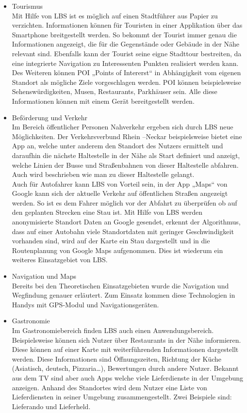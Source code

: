 \begin{itemize}
	\item Tourismus\\
	Mit Hilfe von LBS ist es möglich auf einen Stadtführer aus Papier zu verzichten. Informationen können für Touristen in einer Applikation über das Smartphone breitgestellt werden. So bekommt der Tourist immer genau die Informationen angezeigt, die für die Gegenstände oder Gebäude in der Nähe relevant sind. Ebenfalls kann der Tourist seine eigne Stadttour bestreiten, da eine integrierte Navigation zu Interessenten Punkten realisiert werden kann. Des Weiteren können POI „Points of Intererst“ in Abhängigkeit vom eigenen Standort als mögliche Ziele vorgeschlagen werden. POI können beispielsweise Sehenswürdigkeiten, Musen, Restaurants, Parkhäuser sein.
Alle diese Informationen können mit einem Gerät bereitgestellt werden.

	\item Beförderung und Verkehr\\
	Im Bereich öffentlicher Personen Nahverkehr ergeben sich durch LBS neue Möglichkeiten. Der Verkehrsverbund Rhein –Neckar beispielsweise bietet eine App an, welche unter anderem den Standort des Nutzers ermittelt und daraufhin die nächste Haltestelle in der Nähe als Start definiert und anzeigt, welche Linien der Busse und Straßenbahnen von dieser Haltestelle abfahren. Auch wird beschrieben wie man zu dieser Haltestelle gelangt.
\\Auch für Autofahrer kann LBS von Vorteil sein, in der App „Maps“ von Google kann sich der aktuelle Verkehr auf öffentlichen Straßen angezeigt werden. So ist es dem Fahrer möglich vor der Abfahrt zu überprüfen ob auf den geplanten Strecken eine Stau ist. Mit Hilfe von LBS werden anonymisierte Standort Daten an Google gesendet, erkennt der Algorithmus, dass auf einer Autobahn viele Standortdaten mit geringer Geschwindigkeit vorhanden sind, wird auf der Karte ein Stau dargestellt und in die Routenplanung von Google Maps aufgenommen. Dies ist wiederum ein weiteres Einsatzgebiet von LBS. \cite{StauWarnung}

	
	\item Navigation und Maps\\
	Bereits bei den Theoretischen Einsatzgebieten wurde die Navigation und Wegfindung genauer erläutert. Zum Einsatz kommen diese Technologien in Handys mit GPS-Modul und Navigationsgeräten. 
	
	\item Gastronomie\\
	Im Gastronomiebereich finden LBS auch einen Anwendungsbereich. Beispielsweise können sich Nutzer über Restaurants in der Nähe informieren. Diese können auf einer Karte mit weiterführenden Informationen dargestellt werden. Diese Informationen sind Öffnungszeiten, Richtung der Küche (Asiatisch, deutsch, Pizzaria…), Bewertungen durch andere Nutzer.
Bekannt aus dem TV sind aber auch Apps welche viele Lieferdienste in der Umgebung anzeigen. Anhand des Standortes wird dem Nutzer eine Liste von Lieferdiensten in seiner Umgebung zusammengestellt. Zwei Beispiele sind: Lieferando und Lieferheld.


\end{itemize}
